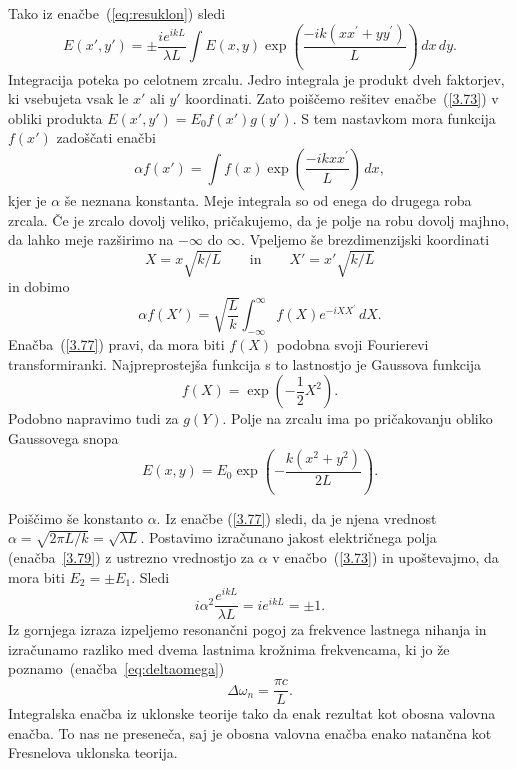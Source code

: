 Tako iz enačbe~(\ref{eq:resuklon}) sledi
\begin{equation}
E(x',y')=\pm\frac{ie^{ikL}}{\lambda L}\int E(x,y)\exp
\left(\frac{-ik(xx^{\prime}+yy^{\prime})}{L}\right)\, dx\, dy.
\label{3.73}
\end{equation}
Integracija poteka po celotnem zrcalu. Jedro integrala je produkt dveh
faktorjev, ki vsebujeta vsak le $x'$ ali $y'$ koordinati. Zato poiščemo
rešitev enačbe~(\ref{3.73}) v obliki produkta 
$E(x',y')=E_{0}f(x')g(y')$.
S tem nastavkom mora funkcija $f(x')$ zadoščati enačbi
\begin{equation}
\alpha f(x')=\int f(x)\exp\left(\frac{-ikxx^{\prime}}{L}\right)\, dx,
\label{3.75}
\end{equation}
kjer je $\alpha$ še neznana konstanta. Meje integrala so od enega do 
drugega roba zrcala. Če je zrcalo dovolj veliko,
pričakujemo, da je polje na robu dovolj majhno, da lahko meje razširimo
na $-\infty$ do $\infty$. Vpeljemo še brezdimenzijski koordinati
\begin{equation}
X=x\sqrt{k/L} \qquad \mathrm{in} \qquad X'=x'\sqrt{k/L}
\label{3.76}
\end{equation}
in dobimo
\begin{equation}
\alpha f(X')=\sqrt{\frac{L}{k}}\int_{-\infty}^{\infty}f(X)e^{-iXX^{\prime}}\, dX.
\label{3.77}
\end{equation}
Enačba~(\ref{3.77}) pravi, da mora
biti $f(X)$ podobna svoji Fourierevi transformiranki. Najpreprostejša
funkcija s to lastnostjo je Gaussova funkcija 
\begin{equation}
f(X)=\exp\left(-\frac{1}{2}X^{2}\right).
\label{3.78}
\end{equation}
Podobno napravimo tudi za $g(Y)$. Polje na zrcalu ima po pričakovanju obliko Gaussovega snopa
\begin{equation}
E(x,y)=E_{0}\exp\left(-\frac{k(x^{2}+y^{2})}{2L}\right).
\label{3.79}
\end{equation}

Poiščimo še konstanto $\alpha$. Iz enačbe (\ref{3.77}) sledi, da je njena vrednost 
$\alpha = \sqrt{2\pi L/k}=\sqrt{\lambda L}$. Postavimo izračunano jakost električnega
polja (enačba~\ref{3.79}) z ustrezno vrednostjo za $\alpha$ v 
enačbo~(\ref{3.73}) in upoštevajmo, da mora biti
$E_{2}=\pm E_{1}$. Sledi
\begin{equation}
i\alpha^{2}\frac{e^{ikL}}{\lambda L}=ie^{ikL}=\pm1.
\label{3.80}
\end{equation}
Iz gornjega izraza izpeljemo resonančni pogoj za frekvence lastnega nihanja 
in izračunamo razliko med dvema lastnima krožnima frekvencama, 
ki jo že poznamo~(enačba~\ref{eq:deltaomega})
\begin{equation}
\Delta \omega_n=\frac{\pi c}{L}.
\label{3.81}
\end{equation}
Integralska enačba iz uklonske teorije tako da
enak rezultat kot obosna valovna enačba. To nas ne preseneča, saj je
obosna valovna enačba enako natančna kot Fresnelova uklonska teorija.

